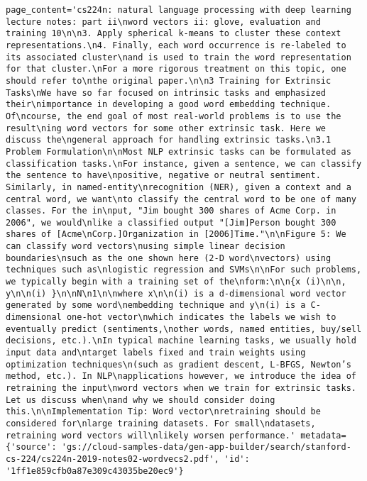 \documentclass[
  letterpaper,
  DIV=11,
  numbers=noendperiod]{scrreprt}
\begin{document}
\begin{verbatim}
page_content='cs224n: natural language processing with deep learning lecture notes: part ii\nword vectors ii: glove, evaluation and training 10\n\n3. Apply spherical k-means to cluster these context representations.\n4. Finally, each word occurrence is re-labeled to its associated cluster\nand is used to train the word representation for that cluster.\nFor a more rigorous treatment on this topic, one should refer to\nthe original paper.\n\n3 Training for Extrinsic Tasks\nWe have so far focused on intrinsic tasks and emphasized their\nimportance in developing a good word embedding technique. Of\ncourse, the end goal of most real-world problems is to use the result\ning word vectors for some other extrinsic task. Here we discuss the\ngeneral approach for handling extrinsic tasks.\n3.1 Problem Formulation\n\nMost NLP extrinsic tasks can be formulated as classification tasks.\nFor instance, given a sentence, we can classify the sentence to have\npositive, negative or neutral sentiment. Similarly, in named-entity\nrecognition (NER), given a context and a central word, we want\nto classify the central word to be one of many classes. For the in\nput, "Jim bought 300 shares of Acme Corp. in 2006", we would\nlike a classified output "[Jim]Person bought 300 shares of [Acme\nCorp.]Organization in [2006]Time."\n\nFigure 5: We can classify word vectors\nusing simple linear decision boundaries\nsuch as the one shown here (2-D word\nvectors) using techniques such as\nlogistic regression and SVMs\n\nFor such problems, we typically begin with a training set of the\nform:\n\n{x (i)\n\n, y\n\n(i) }\n\nN\n1\n\nwhere x\n\n(i) is a d-dimensional word vector generated by some word\nembedding technique and y\n(i) is a C-dimensional one-hot vector\nwhich indicates the labels we wish to eventually predict (sentiments,\nother words, named entities, buy/sell decisions, etc.).\nIn typical machine learning tasks, we usually hold input data and\ntarget labels fixed and train weights using optimization techniques\n(such as gradient descent, L-BFGS, Newton’s method, etc.). In NLP\napplications however, we introduce the idea of retraining the input\nword vectors when we train for extrinsic tasks. Let us discuss when\nand why we should consider doing this.\n\nImplementation Tip: Word vector\nretraining should be considered for\nlarge training datasets. For small\ndatasets, retraining word vectors will\nlikely worsen performance.' metadata={'source': 'gs://cloud-samples-data/gen-app-builder/search/stanford-cs-224/cs224n-2019-notes02-wordvecs2.pdf', 'id': '1ff1e859cfb0a87e309c43035be20ec9'}

\end{verbatim}
\end{document}
